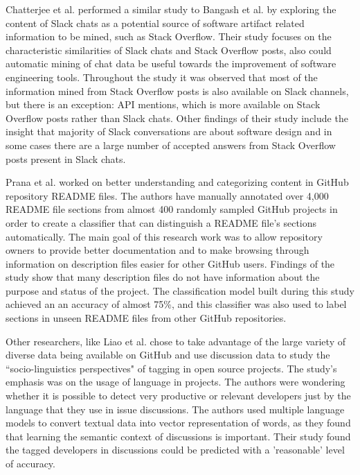         Chatterjee et al. \cite{chatterjee2019exploratory} performed a similar study to Bangash et al. \cite{bangash2019developers} by exploring the content of Slack chats as a potential source of software artifact related information to be mined, such as Stack Overflow. Their study focuses on the characteristic similarities of Slack chats and Stack Overflow posts, also could automatic mining of chat data be useful towards the improvement of software engineering tools. Throughout the study it was observed that most of the information mined from Stack Overflow posts is also available on Slack channels, but there is an exception: API mentions, which is more available on Stack Overflow posts rather than Slack chats. Other findings of their study include the insight that majority of Slack conversations are about software design and in some cases there are a large number of accepted answers from Stack Overflow posts present in Slack chats.
         
        Prana et al. \cite{prana2019categorizing} worked on better understanding and categorizing content in GitHub repository README files. The authors have manually annotated over 4,000 README file sections from almost 400 randomly sampled GitHub projects in order to create a classifier that can distinguish a README file's sections automatically. The main goal of this research work was to allow repository owners to provide better documentation and to make browsing through information on description files easier for other GitHub users. Findings of the study show that many description files do not have information about the purpose and status of the project. The classification model built during this study achieved an an accuracy of almost 75\%, and this classifier was also used to label sections in unseen README files from other GitHub repositories.

        Other researchers, like Liao et al. \cite{liao2019status} chose to take advantage of the large variety of diverse data being available on GitHub and use discussion data to study the ``socio-linguistics perspectives" of tagging in open source projects. The study's emphasis was on the usage of language in projects. The authors were wondering whether it is possible to detect very productive or relevant developers just by the language that they use in issue discussions. The authors used multiple language models to convert textual data into vector representation of words, as they found that learning the semantic context of discussions is important. Their study found the tagged developers in discussions could be predicted with a 'reasonable' level of accuracy.

